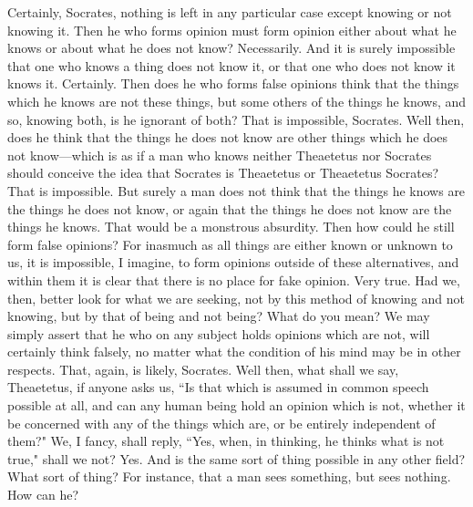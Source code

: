 \documentclass[letterpaper,12pt]{article}
\newcommand{\stephpag}[1]{\marginnote{\small\itshape\fontfamily{ppl}\selectfont #1}}
\begin{document}
\begin{drama}
\theaetetusspeaks
Certainly, Socrates, nothing is left in any particular case except knowing or not knowing it.
\socratesspeaks
Then he who forms opinion must form opinion either about what he knows or about what he does not know?
\theaetetusspeaks
Necessarily.
\socratesspeaks
And it is surely impossible that one who knows a thing does not know it, or that one who does not know it \stephpag{b} knows it.
\theaetetusspeaks
Certainly.
\socratesspeaks
Then does he who forms false opinions think that the things which he knows are not these things, but some others of the things he knows, and so, knowing both, is he ignorant of both?
\theaetetusspeaks
That is impossible, Socrates.
\socratesspeaks
Well then, does he think that the things he does not know are other things which he does not know—which is as if a man who knows neither Theaetetus nor Socrates should conceive the idea that Socrates is Theaetetus or Theaetetus Socrates? \stephpag{c}
\theaetetusspeaks
That is impossible.
\socratesspeaks
But surely a man does not think that the things he knows are the things he does not know, or again that the things he does not know are the things he knows.
\theaetetusspeaks
That would be a monstrous absurdity.
\socratesspeaks
Then how could he still form false opinions? For inasmuch as all things are either known or unknown to us, it is impossible, I imagine, to form opinions outside of these alternatives, and within them it is clear that there is no place for fake opinion.
\theaetetusspeaks
Very true.
\socratesspeaks
Had we, then, better look for what we are seeking, not by this method of knowing and not knowing, but by that of being \stephpag{d} and not being?
\theaetetusspeaks
What do you mean?
\socratesspeaks
We may simply assert that he who on any subject holds opinions which are not, will certainly think falsely, no matter what the condition of his mind may be in other respects.
\theaetetusspeaks
That, again, is likely, Socrates.
\socratesspeaks
Well then, what shall we say, Theaetetus, if anyone asks us, ``Is that which is assumed in common speech possible at all, and can any human being hold an opinion which is not, whether it be concerned with any of the things which are, or be entirely independent of them?" We, I fancy, \stephpag{e} shall reply, ``Yes, when, in thinking, he thinks what is not true," shall we not?
\theaetetusspeaks
Yes.
\socratesspeaks
And is the same sort of thing possible in any other field?
\theaetetusspeaks
What sort of thing?
\socratesspeaks
For instance, that a man sees something, but sees nothing.
\theaetetusspeaks
How can he?
\socratesspeaks

\end{drama}
\end{document}
